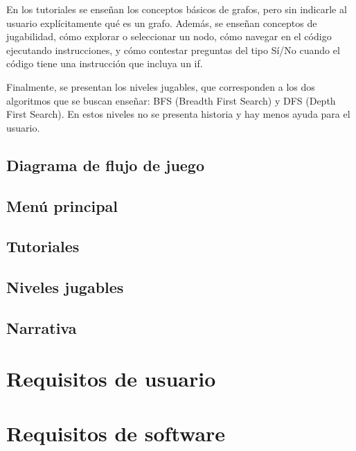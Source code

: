 En los tutoriales se enseñan los conceptos básicos de grafos, pero sin indicarle al usuario explícitamente qué es un grafo. 
Además, se enseñan conceptos de jugabilidad, cómo explorar o seleccionar un nodo, cómo navegar en el código ejecutando instrucciones, 
y cómo contestar preguntas del tipo Sí/No cuando el código tiene una instrucción que incluya un if.

Finalmente, se presentan los niveles jugables, que corresponden a los dos algoritmos que se buscan enseñar: BFS (Breadth First Search) y 
DFS (Depth First Search). En estos niveles no se presenta historia y hay menos ayuda para el usuario.

\subsection{Diagrama de flujo de juego}

\subsection{Menú principal}

\subsection{Tutoriales}

\subsection{Niveles jugables}

\subsection{Narrativa}



\section{Requisitos de usuario}
\section{Requisitos de software}
